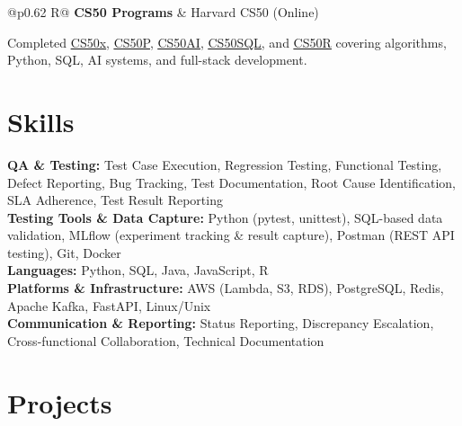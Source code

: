 \documentclass[a4paper,10pt]{article}
\newcommand{\ulink}[2]{\href{#1}{\uline{#2}}}
\newcommand{\subheading}[1]{{\color[HTML]{0A0A0A}\fontsize{12}{14}\selectfont\bfseries #1}}
\newcommand{\meta}[1]{{\color[HTML]{5C5C5C}\fontsize{10.5}{12.5}\selectfont #1}}
\begin{document}
\begin{tabularx}{\linewidth}{@{}p{0.62\linewidth} R@{}}
\subheading{CS50 Programs} & \meta{Harvard CS50 (Online)}
\end{tabularx}
\vspace{2pt}
{\color[HTML]{3A3A3A}\fontsize{11}{14}\selectfont Completed \ulink{https://cs50.harvard.edu/certificates/b14b78df-e05c-413e-a607-1dd27303053a}{CS50x}, \ulink{https://cs50.harvard.edu/certificates/32477052-9db4-49c4-a5a4-d7e58429ca2c}{CS50P}, \ulink{https://cs50.harvard.edu/certificates/9cdb4d4a-1250-4f8e-9fd7-191864e0f919}{CS50AI}, \ulink{https://cs50.harvard.edu/certificates/bc486f24-f085-4e61-8536-80940b97a1b9}{CS50SQL}, and \ulink{https://cs50.harvard.edu/certificates/666838e6-a053-4d82-b179-a60fe745fd84}{CS50R} covering algorithms, Python, SQL, AI systems, and full-stack development.}

\vspace{2pt}

\section{Skills}
\vspace{2pt}
{\color[HTML]{0A0A0A}\fontsize{11}{14}\selectfont
\textbf{QA \& Testing:} Test Case Execution, Regression Testing, Functional Testing, Defect Reporting, Bug Tracking, Test Documentation, Root Cause Identification, SLA Adherence, Test Result Reporting \\[2pt]
\textbf{Testing Tools \& Data Capture:} Python (pytest, unittest), SQL-based data validation, MLflow (experiment tracking \& result capture), Postman (REST API testing), Git, Docker \\[2pt]
\textbf{Languages:} Python, SQL, Java, JavaScript, R \\[2pt]
\textbf{Platforms \& Infrastructure:} AWS (Lambda, S3, RDS), PostgreSQL, Redis, Apache Kafka, FastAPI, Linux/Unix \\[2pt]
\textbf{Communication \& Reporting:} Status Reporting, Discrepancy Escalation, Cross-functional Collaboration, Technical Documentation}

\vspace{2pt}

\section{Projects}
\vspace{2pt}
\end{document}
